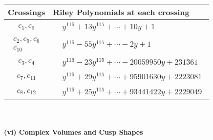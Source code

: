 \documentclass[1p]{elsarticle_modified}
\theoremstyle{definition}
\begin{document}
\begin{tabular}{m{50pt}|m{274pt}}
Crossings & \hspace{64pt}Riley Polynomials at each crossing \\
\hline $$\begin{aligned}c_{1},c_{9}\end{aligned}$$&$\begin{aligned}
&y^{116}+13 y^{115}+\cdots+10 y+1
\end{aligned}$\\
\hline $$\begin{aligned}c_{2},c_{5},c_{6}\\c_{10}\end{aligned}$$&$\begin{aligned}
&y^{116}-55 y^{115}+\cdots-2 y+1
\end{aligned}$\\
\hline $$\begin{aligned}c_{3},c_{4}\end{aligned}$$&$\begin{aligned}
&y^{116}-23 y^{115}+\cdots-20059950 y+231361
\end{aligned}$\\
\hline $$\begin{aligned}c_{7},c_{11}\end{aligned}$$&$\begin{aligned}
&y^{116}+29 y^{115}+\cdots+95901630 y+2223081
\end{aligned}$\\
\hline $$\begin{aligned}c_{8},c_{12}\end{aligned}$$&$\begin{aligned}
&y^{116}+25 y^{115}+\cdots+93441422 y+2229049
\end{aligned}$\\
\hline
\end{tabular}\\~\\
\newpage\flushleft \textbf{(vi) Complex Volumes and Cusp Shapes}
\end{document}
